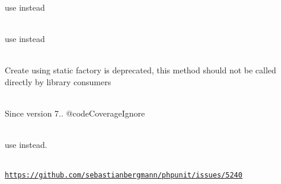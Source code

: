 \begin{DoxyRefList}
\item[Global \doxylink{class_faker_1_1_calculator_1_1_t_c_no_a198c7f83ae867317d9c21b57bff3dff8}{TCNo\+::checksum} (\$identity\+Prefix)]\hfill \\
\label{deprecated__deprecated000056}%
%
use {\ttfamily \doxylink{}{()}} instead  
\item[Global \doxylink{class_faker_1_1_calculator_1_1_t_c_no_a64d20c1f0404d2e3c5c0f483cf684e1f}{TCNo\+::is\+Valid} (\$tc\+No)]\hfill \\
\label{deprecated__deprecated000057}%
%
use {\ttfamily \doxylink{}{()}} instead  
\item[Global \doxylink{classphp_documentor_1_1_reflection_1_1_doc_block_1_1_tags_1_1_template_a6fafdaff738bff5d477ed4a6b97253fe}{Template\+::create} (string \$body)]\hfill \\
\label{deprecated__deprecated000283}%
%
Create using static factory is deprecated, this method should not be called directly by library consumers  
\item[Global \doxylink{class_league_1_1_uri_1_1_uri_template_1_1_template_a3a63ca27a227e8855a6902a2159c9d9b}{Template\+::create\+From\+String} (Stringable\texorpdfstring{$\vert$}{|}string \$template)]\hfill \\
\label{deprecated__deprecated000157}%
%
Since version 7.. @code\+Coverage\+Ignore  
\item[Class \doxylink{class_monolog_1_1_test_1_1_test_case}{Test\+Case} ]\hfill \\
\label{deprecated__deprecated000189}%
%
use  instead.  
\item[Global \doxylink{class_p_h_p_unit_1_1_framework_1_1_test_case_a9748456fbdeec51f76333e816e4fdebf}{Test\+Case\+::create\+Test\+Proxy} (string \$original\+Class\+Name, array \$constructor\+Arguments=\mbox{[}\mbox{]})]\hfill \\
\label{deprecated__deprecated000321}%
%
\href{https://github.com/sebastianbergmann/phpunit/issues/5240}{\texttt{https\+://github.\+com/sebastianbergmann/phpunit/issues/5240}}  
\item[Global \doxylink{class_p_h_p_unit_1_1_framework_1_1_test_case_ae47c52e29e434225de52c19c9a32b492}{Test\+Case\+::get\+Mock\+For\+Abstract\+Class} (string \$original\+Class\+Name, array \$arguments=\mbox{[}\mbox{]}, string \$mock\+Class\+Name=\textquotesingle{}\textquotesingle{}, bool \$call\+Original\+Constructor=true, bool \$call\+Original\+Clone=true, bool \$call\+Autoload=true, array \$mocked\+Methods=\mbox{[}\mbox{]}, bool \$clone\+Arguments=false)]\hfill \\

\end{DoxyRefList}
